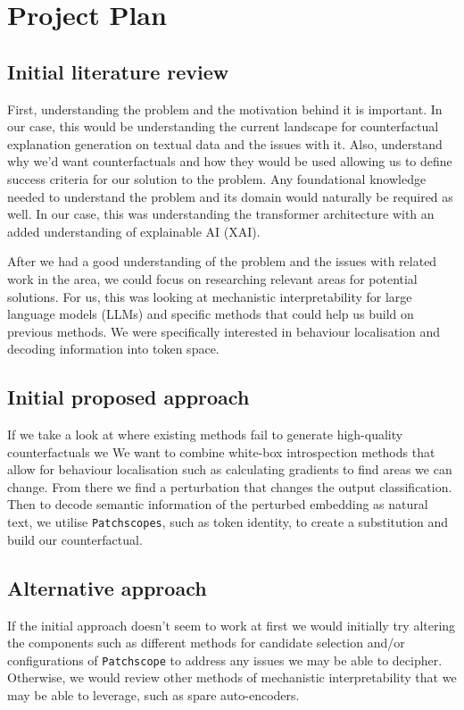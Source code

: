 \chapter{Project Plan}

\section{Initial literature review}
First, understanding the problem and the motivation behind it is important. In our case, this would be understanding the current landscape for counterfactual explanation generation on textual data and the issues with it. Also, understand why we'd want counterfactuals and how they would be used allowing us to define success criteria for our solution to the problem. Any foundational knowledge needed to understand the problem and its domain would naturally be required as well. In our case, this was understanding the transformer architecture with an added understanding of explainable AI (XAI).

After we had a good understanding of the problem and the issues with related work in the area, we could focus on researching relevant areas for potential solutions. For us, this was looking at mechanistic interpretability for large language models (LLMs) and specific methods that could help us build on previous methods. We were specifically interested in behaviour localisation and decoding information into token space.

\section{Initial proposed approach}
If we take a look at where existing methods fail to generate high-quality counterfactuals we 
We want to combine white-box introspection methods that allow for behaviour localisation such as calculating gradients to find areas we can change. From there we find a perturbation that changes the output classification. Then to decode semantic information of the perturbed embedding as natural text, we utilise \texttt{Patchscopes}, such as token identity, to create a substitution and build our counterfactual.

\section{Alternative approach}
If the initial approach doesn't seem to work at first we would initially try altering the components such as different methods for candidate selection and/or configurations of \texttt{Patchscope} to address any issues we may be able to decipher. Otherwise, we would review other methods of mechanistic interpretability that we may be able to leverage, such as spare auto-encoders.

